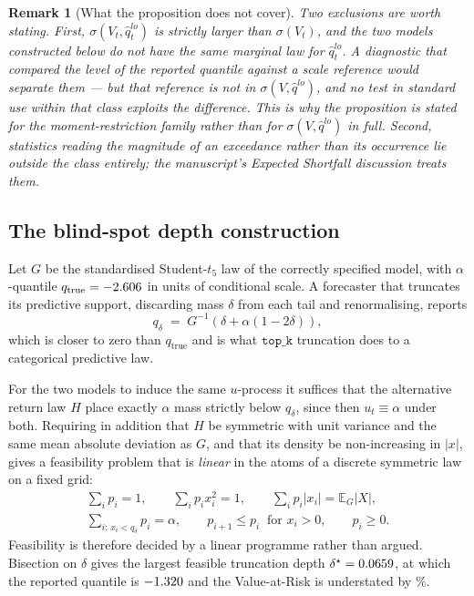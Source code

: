 \documentclass[preprint,11pt,authoryear]{elsarticle}
\newtheorem{remark}[theorem]{Remark}
\newcommand{\E}{\mathbb{E}}
\newcommand{\1}{\boldsymbol{1}}
\begin{document}
\begin{remark}[What the proposition does not cover]
	\label{rem:identification_scope}
	Two exclusions are worth stating. First, $\sigma(V_t, \hat q^{lo}_t)$ is
	strictly larger than $\sigma(V_t)$, and the two models constructed below do
	\emph{not} have the same marginal law for $\hat q^{lo}_t$. A diagnostic that
	compared the level of the reported quantile against a scale reference would
	separate them --- but that reference is not in $\sigma(V,\hat q^{lo})$, and no
	test in standard use within that class exploits the difference. This is why
	the proposition is stated for the moment-restriction family rather than for
	$\sigma(V,\hat q^{lo})$ in full. Second, statistics reading the
	\emph{magnitude} of an exceedance rather than its occurrence lie outside the
	class entirely; the manuscript's Expected Shortfall discussion treats them.
\end{remark}

\subsection{The blind-spot depth construction}
\label{app:blindspot_depth}

Let $G$ be the standardised Student-$t_5$ law of the correctly specified model,
with $\alpha$-quantile $q_{\mathrm{true}} = -2.606$ in units of
conditional scale. A forecaster that truncates its predictive support, discarding
mass $\delta$ from each tail and renormalising, reports
\[
q_\delta \;=\; G^{-1}\!\left(\delta + \alpha(1-2\delta)\right),
\]
which is closer to zero than $q_{\mathrm{true}}$ and is what
$\texttt{top\_k}$ truncation does to a categorical predictive law.

For the two models to induce the same $u$-process it suffices that the
alternative return law $H$ place exactly $\alpha$ mass strictly below $q_\delta$,
since then $u_t \equiv \alpha$ under both. Requiring in addition that $H$ be
symmetric with unit variance and the same mean absolute deviation as $G$, and
that its density be non-increasing in $|x|$, gives a feasibility problem that is
\emph{linear} in the atoms of a discrete symmetric law on a fixed grid:
\begin{align*}
	\textstyle\sum_i p_i = 1, \qquad
	\textstyle\sum_i p_i x_i^2 = 1, \qquad
	\textstyle\sum_i p_i |x_i| = \E_G|X|, \\
	\textstyle\sum_{i:\,x_i < q_\delta} p_i = \alpha, \qquad
	p_{i+1} \le p_i \ \text{ for } x_i > 0, \qquad p_i \ge 0 .
\end{align*}
Feasibility is therefore decided by a linear programme rather than argued.
Bisection on $\delta$ gives the largest feasible truncation depth
$\delta^\star = 0.0659$, at which the reported quantile is
$-1.320$ and the Value-at-Risk is understated by \nGapUndUni\%.
\end{document}
